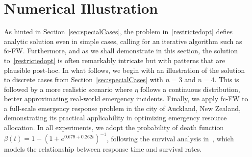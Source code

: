 \documentclass[stsy,sglanonrev]{informs4}
\newcommand{\death}{{\beta}}
\begin{document}
\section{Numerical Illustration}\label{sec:implementation}

As hinted in Section~\ref{sec:specialCases}, the problem in~\eqref{restrictedopt} defies analytic solution even in simple cases, calling for an iterative algorithm such as fc-FW. Furthermore, and as we shall demonstrate in this section, the solution to~\eqref{restrictedopt} is often remarkably intricate but with patterns that are plausible post-hoc. In what follows, we begin with an illustration of the solution to discrete cases from Section~\ref{sec:specialCases} with \( n = 3 \) and \( n = 4 \). This is followed by a more realistic scenario where \( \eta \) follows a continuous distribution, better approximating real-world emergency incidents. Finally, we apply fc-FW to a full-scale emergency response problem in the city of Auckland, New Zealand, demonstrating its practical applicability in optimizing emergency resource allocation. In all experiments, we adopt the probability of death function \( \death(t) = 1 - (1 + e^{0.679 + 0.262t})^{-1} \), following the survival analysis in~\cite{de2003optimal}, which models the relationship between response time and survival rates.


\end{document}
